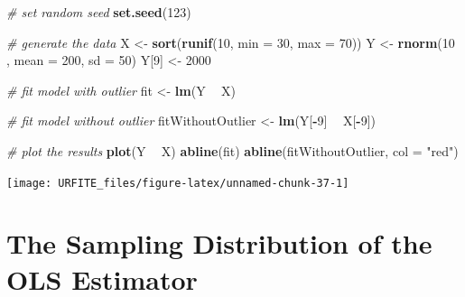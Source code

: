 \documentclass[]{book}
\newenvironment{Shaded}{\begin{snugshade}}{\end{snugshade}}
\newcommand{\KeywordTok}[1]{\textcolor[rgb]{0.13,0.29,0.53}{\textbf{#1}}}
\newcommand{\DataTypeTok}[1]{\textcolor[rgb]{0.13,0.29,0.53}{#1}}
\newcommand{\DecValTok}[1]{\textcolor[rgb]{0.00,0.00,0.81}{#1}}
\newcommand{\StringTok}[1]{\textcolor[rgb]{0.31,0.60,0.02}{#1}}
\newcommand{\CommentTok}[1]{\textcolor[rgb]{0.56,0.35,0.01}{\textit{#1}}}
\newcommand{\OperatorTok}[1]{\textcolor[rgb]{0.81,0.36,0.00}{\textbf{#1}}}
\newcommand{\NormalTok}[1]{#1}
\theoremstyle{definition}
\theoremstyle{definition}
\theoremstyle{definition}
\theoremstyle{remark}
\begin{document}
\begin{Shaded}
\begin{Highlighting}[]
\CommentTok{# set random seed}
\KeywordTok{set.seed}\NormalTok{(}\DecValTok{123}\NormalTok{)}

\CommentTok{# generate the data}
\NormalTok{X <-}\StringTok{ }\KeywordTok{sort}\NormalTok{(}\KeywordTok{runif}\NormalTok{(}\DecValTok{10}\NormalTok{, }\DataTypeTok{min =} \DecValTok{30}\NormalTok{, }\DataTypeTok{max =} \DecValTok{70}\NormalTok{))}
\NormalTok{Y <-}\StringTok{ }\KeywordTok{rnorm}\NormalTok{(}\DecValTok{10}\NormalTok{ , }\DataTypeTok{mean =} \DecValTok{200}\NormalTok{, }\DataTypeTok{sd =} \DecValTok{50}\NormalTok{)}
\NormalTok{Y[}\DecValTok{9}\NormalTok{] <-}\StringTok{ }\DecValTok{2000}

\CommentTok{# fit model with outlier}
\NormalTok{fit <-}\StringTok{ }\KeywordTok{lm}\NormalTok{(Y }\OperatorTok{~}\StringTok{ }\NormalTok{X)}

\CommentTok{# fit model without outlier}
\NormalTok{fitWithoutOutlier <-}\StringTok{ }\KeywordTok{lm}\NormalTok{(Y[}\OperatorTok{-}\DecValTok{9}\NormalTok{] }\OperatorTok{~}\StringTok{ }\NormalTok{X[}\OperatorTok{-}\DecValTok{9}\NormalTok{])}

\CommentTok{# plot the results}
\KeywordTok{plot}\NormalTok{(Y }\OperatorTok{~}\StringTok{ }\NormalTok{X)}
\KeywordTok{abline}\NormalTok{(fit)}
\KeywordTok{abline}\NormalTok{(fitWithoutOutlier, }\DataTypeTok{col =} \StringTok{"red"}\NormalTok{)}
\end{Highlighting}
\end{Shaded}

\begin{center}\texttt{[image: URFITE\_files/figure-latex/unnamed-chunk-37-1]} \end{center}

\section{The Sampling Distribution of the OLS Estimator}\label{tsdotoe}
\end{document}
